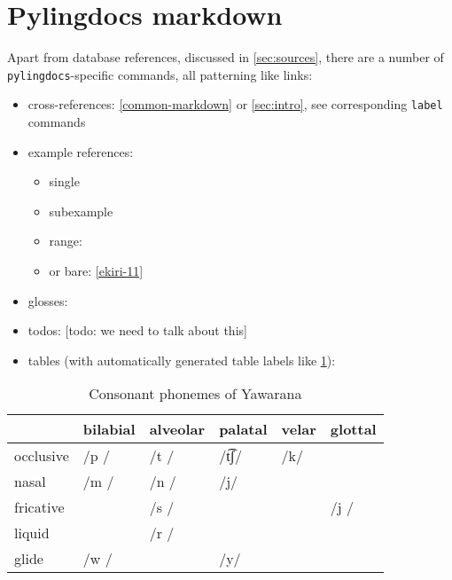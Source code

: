 \documentclass{article}
\begin{document}
\section{\texorpdfstring{Pylingdocs markdown
\label{pld-md}}{Pylingdocs markdown }}

Apart from database references, discussed in \cref{sec:sources}, there
are a number of \texttt{pylingdocs}-specific commands, all patterning
like links:

\begin{itemize}
\tightlist
\item
  cross-references: \cref{common-markdown} or \cref{sec:intro}, see
  corresponding \texttt{label} commands
\item
  example references:

  \begin{itemize}
  \tightlist
  \item
    single 
  \item
    subexample 
  \item
    range: 
  \item
    or bare: \ref{ekiri-11}
  \end{itemize}
\item
  glosses: 
\item
  todos: {[}todo: we need to talk about this{]}
\item
  tables (with automatically generated table labels like
  \cref{tab:consonants}):
\end{itemize}

\begin{table}
\caption{Consonant phonemes of Yawarana}
\label{tab:consonants}
\centering
\begin{tabular}{llllll}
\toprule
          & bilabial & alveolar & palatal & velar & glottal \\
\midrule
occlusive &     /p / &     /t / &   /t͡ʃ/ &   /k/ &         \\
    nasal &     /m / &     /n / &     /j/ &       &         \\
fricative &          &     /s / &         &       &    /j / \\
   liquid &          &     /r / &         &       &         \\
    glide &     /w / &          &     /y/ &       &         \\
\bottomrule
\end{tabular}

\end{table}
\end{document}
